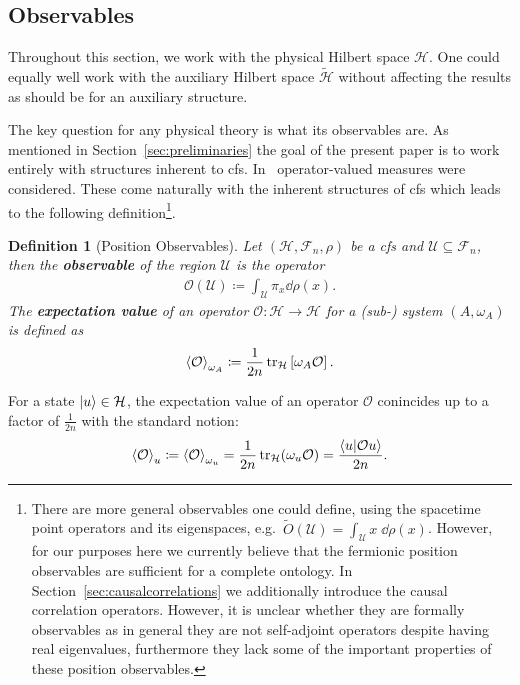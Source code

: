 \documentclass[reqno,11pt]{amsart}
\newcommand{\defeq}{\coloneqq}
\renewcommand{\H}{\mathcal{H}}
\newcommand{\F}{{\mathcal{F}}}
\newtheorem{definition}{Definition}[section]
\numberwithin{equation}{section}
\begin{document}
% 

\subsection{Observables}\label{subsec:observables}

Throughout this section, we work with the physical Hilbert space $\H$.
One could equally well work with the auxiliary Hilbert space $\tilde{\H}$ without affecting the results as should be
for an auxiliary structure.

The key question for any physical theory is what its observables are.
As mentioned in Section~\ref{sec:preliminaries} the goal of the present paper is to work entirely with structures inherent
to \ac{cfs}.
In~\cite{dzhunushaliev2023quantum, dzhunushaliev2023quantization} operator-valued measures were considered.
These come naturally with the inherent structures of \ac{cfs} which leads to the following definition\footnote{
    There are more general observables one could define, using the spacetime point operators and its eigenspaces,
    e.g.~$\tilde{O}(\mathcal{U}) =  \int_\mathcal{U} x\;  \dd \rho(x)$.
    However, for our purposes here we currently believe that the fermionic position observables are sufficient for a complete ontology.
    In Section~\ref{sec:causalcorrelations} we additionally introduce the causal correlation operators.
    However, it is unclear whether they are formally observables as in general they are not self-adjoint operators despite having real eigenvalues, furthermore they lack some of the important properties of these position observables.
}.

\begin{definition}[Position Observables] \label{def:observables}
    Let $(\H, \F_n, \rho)$ be a \ac{cfs} and $\mathcal{U} \subseteq \F_n$, then the \textbf{observable} of the region $\mathcal{U}$ is the operator
    \begin{align}
        \mathcal{O}(\mathcal{U}) \defeq \int_\mathcal{U} \pi_x \dd \rho(x).
    \end{align}
    The \textbf{expectation value} of an operator $\mathcal{O}: \H \to \H$ for a (sub-) system $(A, \omega_A)$ is defined as
    \begin{align}
        \expval{\mathcal{O}}_{\omega_A} \defeq \frac{1}{2n} \tr_{\H} \left[ \omega_A \mathcal{O} \right].
    \end{align}
\end{definition}
For a state $\ket{u} \in \H$, the expectation value of an operator $\mathcal{O}$ conincides up to a factor of $\frac{1}{2n}$
with the standard notion:
\begin{align}
    \expval{\mathcal{O}}_{u} \defeq \expval{\mathcal{O}}_{\omega_u} = \frac{1}{2n} \tr_\H (\omega_u \mathcal{O}) = \frac{\braket{u}{\mathcal{O} u}}{2n}.
\end{align}
\end{document}
